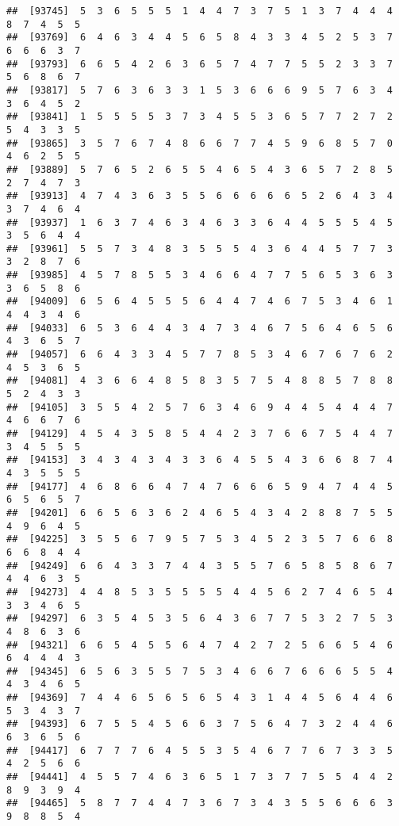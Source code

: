 \documentclass[
]{book}
\begin{document}
\begin{verbatim}
##  [93745]  5  3  6  5  5  5  1  4  4  7  3  7  5  1  3  7  4  4  4  8  7  4  5  5
##  [93769]  6  4  6  3  4  4  5  6  5  8  4  3  3  4  5  2  5  3  7  6  6  6  3  7
##  [93793]  6  6  5  4  2  6  3  6  5  7  4  7  7  5  5  2  3  3  7  5  6  8  6  7
##  [93817]  5  7  6  3  6  3  3  1  5  3  6  6  6  9  5  7  6  3  4  3  6  4  5  2
##  [93841]  1  5  5  5  5  3  7  3  4  5  5  3  6  5  7  7  2  7  2  5  4  3  3  5
##  [93865]  3  5  7  6  7  4  8  6  6  7  7  4  5  9  6  8  5  7  0  4  6  2  5  5
##  [93889]  5  7  6  5  2  6  5  5  4  6  5  4  3  6  5  7  2  8  5  2  7  4  7  3
##  [93913]  4  7  4  3  6  3  5  5  6  6  6  6  6  5  2  6  4  3  4  3  7  4  6  4
##  [93937]  1  6  3  7  4  6  3  4  6  3  3  6  4  4  5  5  5  4  5  3  5  6  4  4
##  [93961]  5  5  7  3  4  8  3  5  5  5  4  3  6  4  4  5  7  7  3  3  2  8  7  6
##  [93985]  4  5  7  8  5  5  3  4  6  6  4  7  7  5  6  5  3  6  3  3  6  5  8  6
##  [94009]  6  5  6  4  5  5  5  6  4  4  7  4  6  7  5  3  4  6  1  4  4  3  4  6
##  [94033]  6  5  3  6  4  4  3  4  7  3  4  6  7  5  6  4  6  5  6  4  3  6  5  7
##  [94057]  6  6  4  3  3  4  5  7  7  8  5  3  4  6  7  6  7  6  2  4  5  3  6  5
##  [94081]  4  3  6  6  4  8  5  8  3  5  7  5  4  8  8  5  7  8  8  5  2  4  3  3
##  [94105]  3  5  5  4  2  5  7  6  3  4  6  9  4  4  5  4  4  4  7  4  6  6  7  6
##  [94129]  4  5  4  3  5  8  5  4  4  2  3  7  6  6  7  5  4  4  7  3  4  5  5  5
##  [94153]  3  4  3  4  3  4  3  3  6  4  5  5  4  3  6  6  8  7  4  4  3  5  5  5
##  [94177]  4  6  8  6  6  4  7  4  7  6  6  6  5  9  4  7  4  4  5  6  5  6  5  7
##  [94201]  6  6  5  6  3  6  2  4  6  5  4  3  4  2  8  8  7  5  5  4  9  6  4  5
##  [94225]  3  5  5  6  7  9  5  7  5  3  4  5  2  3  5  7  6  6  8  6  6  8  4  4
##  [94249]  6  6  4  3  3  7  4  4  3  5  5  7  6  5  8  5  8  6  7  4  4  6  3  5
##  [94273]  4  4  8  5  3  5  5  5  5  4  4  5  6  2  7  4  6  5  4  3  3  4  6  5
##  [94297]  6  3  5  4  5  3  5  6  4  3  6  7  7  5  3  2  7  5  3  4  8  6  3  6
##  [94321]  6  6  5  4  5  5  6  4  7  4  2  7  2  5  6  6  5  4  6  6  4  4  4  3
##  [94345]  6  5  6  3  5  5  7  5  3  4  6  6  7  6  6  6  5  5  4  4  3  4  6  5
##  [94369]  7  4  4  6  5  6  5  6  5  4  3  1  4  4  5  6  4  4  6  5  3  4  3  7
##  [94393]  6  7  5  5  4  5  6  6  3  7  5  6  4  7  3  2  4  4  6  6  3  6  5  6
##  [94417]  6  7  7  7  6  4  5  5  3  5  4  6  7  7  6  7  3  3  5  4  2  5  6  6
##  [94441]  4  5  5  7  4  6  3  6  5  1  7  3  7  7  5  5  4  4  2  8  9  3  9  4
##  [94465]  5  8  7  7  4  4  7  3  6  7  3  4  3  5  5  6  6  6  3  9  8  8  5  4

\end{verbatim}
\end{document}
